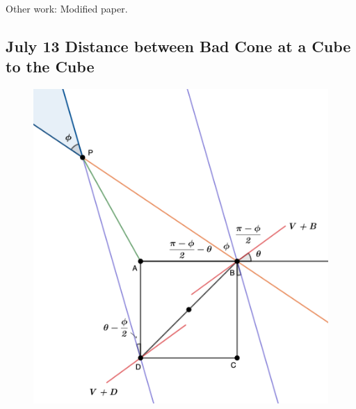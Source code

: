 Other work: Modified paper.


\newpage
\subsection{July 13 Distance between Bad Cone at a Cube to the Cube}

\begin{figure}[H]
    \centering
    \includegraphics[width=.66\textwidth]{images/dist-CBQ2Q.png}
\end{figure}

